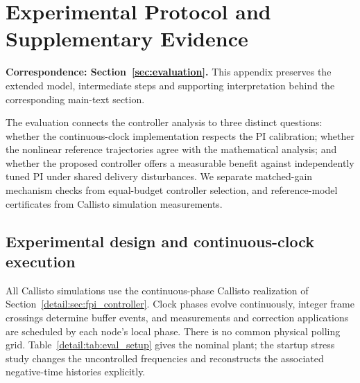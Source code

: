 \section{Experimental Protocol and Supplementary Evidence}
\label{app:evaluation}
\noindent\textbf{Correspondence: Section~\ref{sec:evaluation}.} This appendix preserves the extended model, intermediate steps and supporting interpretation behind the corresponding main-text section.


\label{detail:sec:evaluation}

The evaluation connects the controller analysis to three distinct questions:
whether the continuous-clock implementation respects the PI calibration;
whether the nonlinear reference trajectories agree with the mathematical
analysis; and whether the proposed controller offers a measurable benefit
against independently tuned PI under shared delivery disturbances. We
separate matched-gain mechanism checks from equal-budget controller
selection, and reference-model certificates from Callisto simulation measurements.

\subsection{Experimental design and continuous-clock execution}
\label{detail:subsec:eval_design}

All Callisto simulations use the continuous-phase Callisto realization of
Section~\ref{detail:sec:fpi_controller}. Clock phases evolve continuously,
integer frame crossings determine buffer events, and measurements and
correction applications are scheduled by each node's local phase. There
is no common physical polling grid. Table~\ref{detail:tab:eval_setup} gives the
nominal plant; the startup stress study changes the uncontrolled frequencies
and reconstructs the associated negative-time histories explicitly.

